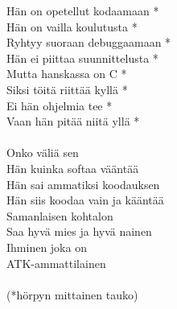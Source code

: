 
            Hän on opetellut kodaamaan * \\
            Hän on vailla koulutusta * \\
            Ryhtyy suoraan debuggaamaan * \\
            Hän ei piittaa suunnittelusta * \\
            Mutta hanskassa on C * \\
            Siksi töitä riittää kyllä * \\
            Ei hän ohjelmia tee * \\
            Vaan hän pitää niitä yllä * \\
\hspace{10mm} \\
            Onko väliä sen \\
            Hän kuinka softaa vääntää \\
            Hän sai ammatiksi koodauksen \\
            Hän siis koodaa vain ja kääntää \\
            Samanlaisen kohtalon \\
            Saa hyvä mies ja hyvä nainen \\
            Ihminen joka on \\
            ATK-ammattilainen \\
\hspace{10mm} \\
            (*hörpyn mittainen tauko) \\
